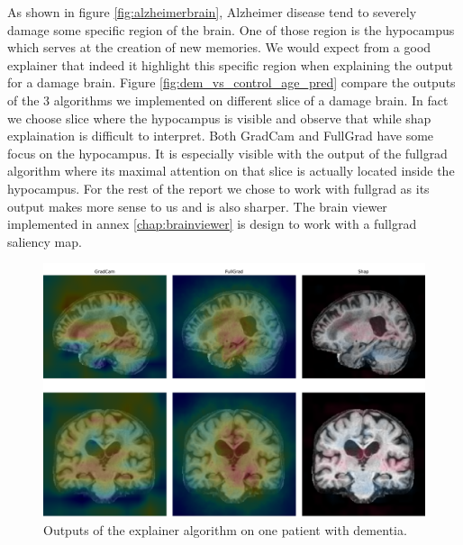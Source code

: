 As shown in figure \ref{fig:alzheimerbrain}, Alzheimer disease tend to severely damage some specific  region of the brain. One of those region is the hypocampus which serves at the creation of new memories. We would expect from a good explainer that indeed it highlight this specific region when explaining the output for a damage brain. Figure \ref{fig:dem_vs_control_age_pred} compare the outputs of the 3 algorithms we implemented on different slice of a damage brain. In fact we choose slice where the hypocampus is visible and observe that while shap explaination is difficult to interpret. Both GradCam and FullGrad have some focus on the hypocampus. It is especially visible with the output of the fullgrad algorithm where its maximal attention on that slice is actually located inside the hypocampus. For the rest of the report we chose to work with fullgrad as its output makes more sense to us and is also sharper. The brain viewer implemented in annex \ref{chap:brainviewer} is design to work with a fullgrad saliency map. 


\begin{figure}
    \centering
    \includegraphics[width=.9\linewidth]{figures/Experiements/explainer_coparaison.pdf}
    \caption{Outputs of the explainer algorithm on one patient with dementia.}
    \label{fig:explainer_compared}
\end{figure}


